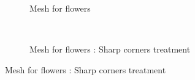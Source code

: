 \begin{figure}[h!]
    \begin{subfigure}[b]{1\linewidth}
        \centering
        \caption{Mesh for flowers}
    \end{subfigure}
    \\
    \begin{subfigure}[b]{1\linewidth}
        \centering
        \caption{Mesh for flowers : Sharp corners treatment}
    \end{subfigure}
\end{figure}

